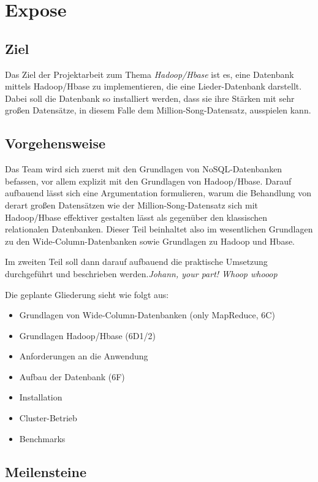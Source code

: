 \chapter{Expose}
\section{Ziel}
Das Ziel der Projektarbeit zum Thema \textit{Hadoop/Hbase} ist es, 
eine Datenbank mittels Hadoop/Hbase zu implementieren, die eine Lieder-Datenbank
darstellt. Dabei soll die Datenbank so installiert werden, dass sie ihre Stärken mit
sehr großen Datensätze, in diesem Falle dem Million-Song-Datensatz, ausspielen kann.

\section{Vorgehensweise}
Das Team wird sich zuerst mit den Grundlagen von NoSQL-Datenbanken befassen, 
vor allem explizit mit den Grundlagen von Hadoop/Hbase. Darauf aufbauend lässt
sich eine Argumentation formulieren, warum die Behandlung von derart großen Datensätzen
wie der Million-Song-Datensatz sich mit Hadoop/Hbase effektiver gestalten lässt als gegenüber
den klassischen relationalen Datenbanken. Dieser Teil beinhaltet also im wesentlichen
Grundlagen zu den Wide-Column-Datenbanken sowie Grundlagen zu Hadoop und Hbase.

Im zweiten Teil soll dann darauf aufbauend die praktische Umsetzung durchgeführt und beschrieben
werden.\textit{Johann, your part! Whoop whooop}

Die geplante Gliederung sieht wie folgt aus:
\begin{itemize}
	\item Grundlagen von Wide-Column-Datenbanken (only MapReduce, 6C)
	\item Grundlagen Hadoop/Hbase (6D1/2)
	\item Anforderungen an die Anwendung
	\item Aufbau der Datenbank (6F)
	\item Installation
	\item Cluster-Betrieb
	\item Benchmarks
\end{itemize}

\section{Meilensteine}
